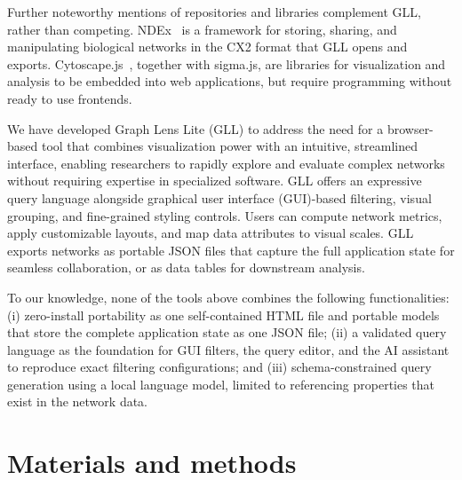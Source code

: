 Further noteworthy mentions of repositories and libraries complement GLL, rather than competing. NDEx~\citep{prattNDExNetworkData2015} is a framework for storing, sharing, and manipulating biological networks in the CX2 format that GLL opens and exports. Cytoscape.js~\citep{franzCytoscapejsGraphTheory2016,franzCytoscapejs2023Update2023}, together with sigma.js, are libraries for visualization and analysis to be embedded into web applications, but require programming without ready to use frontends.

We have developed Graph Lens Lite (GLL) to address the need for a browser-based tool that combines visualization power with an intuitive, streamlined interface, enabling researchers to rapidly explore and evaluate complex networks without requiring expertise in specialized software. GLL offers an expressive query language alongside graphical user interface (GUI)-based filtering, visual grouping, and fine-grained styling controls. Users can compute network metrics, apply customizable layouts, and map data attributes to visual scales. GLL exports networks as portable JSON files that capture the full application state for seamless collaboration, or as data tables for downstream analysis.

To our knowledge, none of the tools above combines the following functionalities: (i) zero-install portability as one self-contained HTML file and portable models that store the complete application state as one JSON file; (ii) a validated query language as the foundation for GUI filters, the query editor, and the AI assistant to reproduce exact filtering configurations; and (iii) schema-constrained query generation using a local language model, limited to referencing properties that exist in the network data.

\section{Materials and methods}

